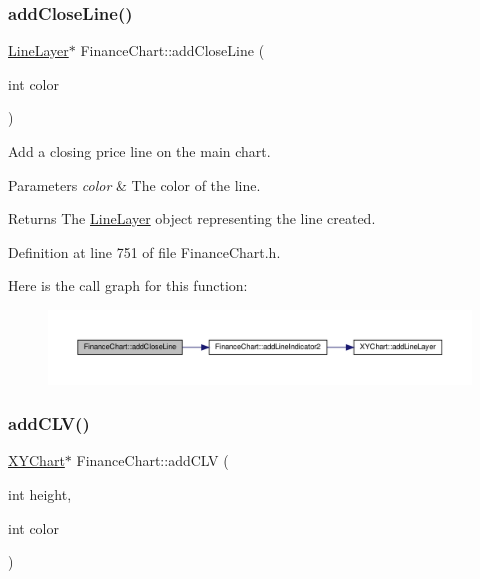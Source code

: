 \subsubsection{\texorpdfstring{add\+Close\+Line()}{addCloseLine()}}
{\footnotesize\ttfamily \hyperlink{class_line_layer}{Line\+Layer}$\ast$ Finance\+Chart\+::add\+Close\+Line (\begin{DoxyParamCaption}\item[{int}]{color }\end{DoxyParamCaption})\hspace{0.3cm}{\ttfamily [inline]}}



Add a closing price line on the main chart. 


\begin{DoxyParams}{Parameters}
{\em color} & The color of the line.\\
\hline
\end{DoxyParams}
\begin{DoxyReturn}{Returns}
The \hyperlink{class_line_layer}{Line\+Layer} object representing the line created.
\end{DoxyReturn}


Definition at line 751 of file Finance\+Chart.\+h.

Here is the call graph for this function\+:
\nopagebreak
\begin{figure}[H]
\begin{center}
\leavevmode
\includegraphics[width=350pt]{class_finance_chart_a2404e8f142be11179a1f41480e14d245_cgraph}
\end{center}
\end{figure}
\mbox{\label{class_finance_chart_a1541d5239c097f1f35b426830d569bc8}} 
\subsubsection{\texorpdfstring{add\+C\+L\+V()}{addCLV()}}
{\footnotesize\ttfamily \hyperlink{class_x_y_chart}{X\+Y\+Chart}$\ast$ Finance\+Chart\+::add\+C\+LV (\begin{DoxyParamCaption}\item[{int}]{height,  }\item[{int}]{color }\end{DoxyParamCaption})\hspace{0.3cm}{\ttfamily [inline]}}



